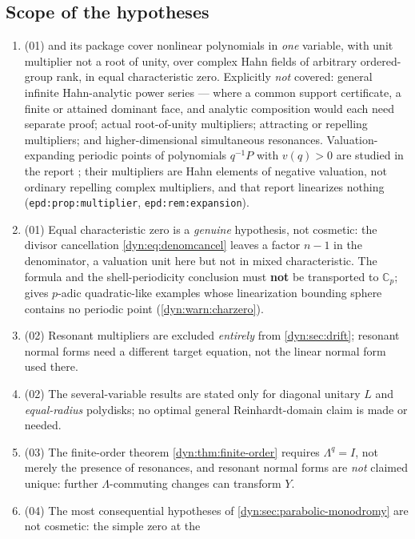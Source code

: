 \documentclass[11pt,letterpaper]{article}
\theoremstyle{definition}
\theoremstyle{remark}
\newcommand{\C}{\mathbb C}
\numberwithin{equation}{section}
\begin{document}
\subsection{Scope of the hypotheses}
\begin{enumerate}[label=\textbf{N\arabic*.},leftmargin=3.2em,start=18]
\item (01)  and its package cover nonlinear
polynomials in \emph{one} variable, with unit multiplier not a root of
unity, over complex Hahn fields of arbitrary ordered-group rank, in equal
characteristic zero. Explicitly \emph{not} covered: general infinite
Hahn-analytic power series --- where a common support certificate, a finite
or attained dominant face, and analytic composition would each need
separate proof; actual root-of-unity multipliers; attracting or repelling
multipliers; and higher-dimensional simultaneous resonances.
Valuation-expanding periodic points of polynomials $q^{-1}P$ with $v(q)>0$
are studied in the report
; their multipliers are
Hahn elements of negative valuation, not ordinary repelling complex
multipliers, and that report linearizes nothing
(\texttt{epd:prop:multiplier}, \texttt{epd:rem:expansion}).
\item (01) Equal characteristic zero is a \emph{genuine} hypothesis, not
cosmetic: the divisor cancellation \eqref{dyn:eq:denomcancel} leaves a
factor $n-1$ in the denominator, a valuation unit here but not in mixed
characteristic. The formula and the shell-periodicity conclusion must
\textbf{not} be transported to $\C_p$; \cite[Cor.~C]{LindahlPadic} gives
$p$-adic quadratic-like examples whose linearization bounding sphere
contains no periodic point (\cref{dyn:warn:charzero}).
\item (02) Resonant multipliers are excluded \emph{entirely} from
\cref{dyn:sec:drift}; resonant normal forms need a different target
equation, not the linear normal form used there.
\item (02) The several-variable results are stated only for diagonal
unitary $L$ and \emph{equal-radius} polydisks; no optimal general
Reinhardt-domain claim is made or needed.
\item (03) The finite-order theorem \cref{dyn:thm:finite-order} requires
$\Lambda^{q}=I$, not merely the presence of resonances, and resonant normal
forms are \emph{not} claimed unique: further $\Lambda$-commuting changes
can transform $Y$.
\item (04) The most consequential hypotheses of
\cref{dyn:sec:parabolic-monodromy} are not cosmetic: the simple zero at the

\end{enumerate}
\end{document}
